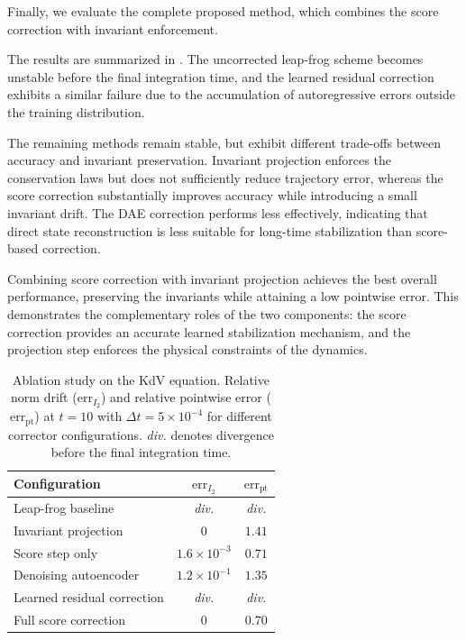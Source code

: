 \documentclass[letterpaper]{article} %
\begin{document}
Finally, we evaluate the complete proposed method, which combines the score
correction with invariant enforcement.

The results are summarized in . The uncorrected
leap-frog scheme becomes unstable before the final integration time, and the
learned residual correction exhibits a similar failure due to the accumulation
of autoregressive errors outside the training distribution.

The remaining methods remain stable, but exhibit different trade-offs between
accuracy and invariant preservation. Invariant projection enforces the
conservation laws but does not sufficiently reduce trajectory error,
whereas the score correction substantially improves accuracy while introducing
a small invariant drift. The DAE correction performs less effectively,
indicating that direct state reconstruction is less suitable for long-time
stabilization than score-based correction.

Combining score correction with invariant projection achieves the best overall
performance, preserving the invariants while attaining a low
pointwise error. This demonstrates the complementary roles of the two
components: the score correction provides an accurate learned stabilization
mechanism, and the projection step enforces the physical constraints of the
dynamics.

\begin{table}[h]
\centering
\caption{Ablation study on the KdV equation. Relative norm drift
($\mathrm{err}_{I_2}$) and relative pointwise error
($\mathrm{err}_{\mathrm{pt}}$) at $t=10$ with $\Delta t=5\times10^{-4}$ for
different corrector configurations. \emph{div.} denotes divergence before the
final integration time.}
\label{tab:ablation_study}
\begin{tabular}{l c c}
\toprule
\textbf{Configuration} & $\mathrm{err}_{I_2}$ & $\mathrm{err}_{\mathrm{pt}}$ \\
\midrule
Leap-frog baseline & \textit{div.} & \textit{div.} \\
Invariant projection & $0$ & $1.41$ \\
Score step only & $1.6\times10^{-3}$ & $0.71$ \\
Denoising autoencoder & $1.2\times10^{-1}$ & $1.35$ \\
Learned residual correction & \textit{div.} & \textit{div.} \\
Full score correction & $0$ & $0.70$ \\
\bottomrule
\end{tabular}
\end{table}
\end{document}
